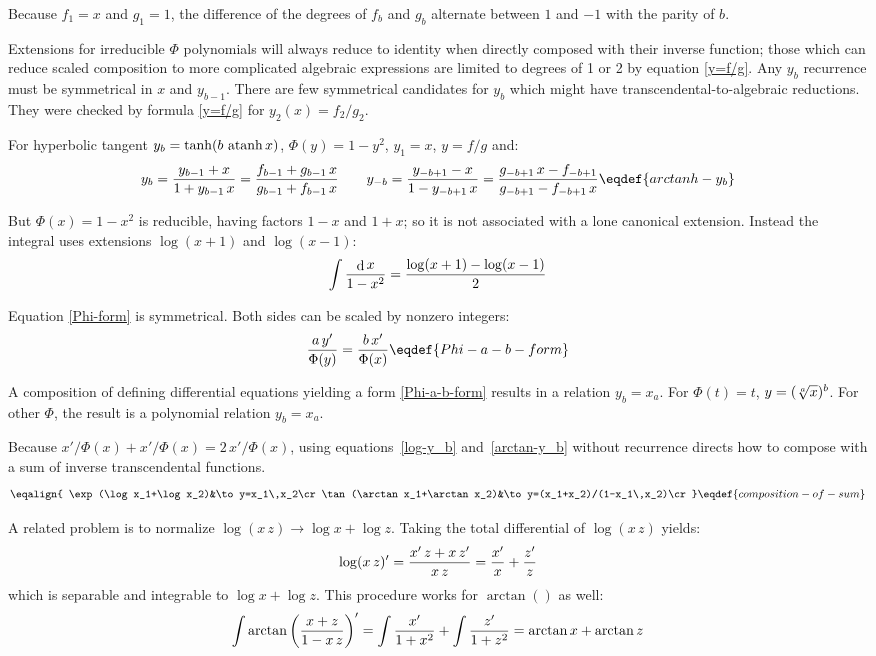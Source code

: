 Because $f_{1}=x$ and $g_{1}=1$, the difference of the degrees of
$f_{b}$ and $g_{b}$ alternate between $1$ and $-1$ with the parity of
$b$.

Extensions for irreducible $\Phi$ polynomials will always reduce
to identity when directly composed with their inverse function; those
which can reduce scaled composition to more complicated algebraic
expressions are limited to degrees of 1 or 2 by
equation \eqref{y=f/g}.  Any $y_{b}$ recurrence must be symmetrical in
$x$ and $y_{b-1}$.  There are few symmetrical candidates for $y_{b}$
which might have transcendental-to-algebraic reductions.  They were
checked by formula \eqref{y=f/g} for $y_2(x)=f_2/g_2$.

For hyperbolic tangent $y_{b}=\tanh(b\,\mathop{\rm atanh}\nolimits x)$, $\Phi(y)=1-y^2$, $y_{1}=x$, $y=f/g$ and:
$$y_{b}={y_{b-1}+x\over1+y_{b-1}\,x}=
  {f_{b-1}+g_{b-1}\,x\over g_{b-1}+f_{b-1}\,x}\qquad
  y_{-b}={y_{-b+1}-x\over1-y_{-b+1}\,x}=
  {g_{-b+1}\,x-f_{-b+1}\over g_{-b+1}-f_{-b+1}\,x}\eqdef{arctanh-y_b}$$

But $\Phi(x)=1-x^2$ is reducible, having factors $1-x$ and $1+x$; so
it is not associated with a lone canonical extension.  Instead
the integral uses extensions $\log(x+1)$ and $\log(x-1)$:
$$\int{\mathop{\rm d}\nolimits{x}\over1-x^2}={\log(x+1)-\log(x-1)\over2}$$

Equation \eqref{Phi-form} is symmetrical.  Both sides can be scaled by
nonzero integers:
$${a\,y'\over\Phi(y)}={b\,x'\over\Phi(x)}\eqdef{Phi-a-b-form}$$

A composition of defining differential equations yielding a
form \eqref{Phi-a-b-form} results in a relation $y_{b}=x_{a}$.  For
$\Phi(t)=t$, $y=(\root{a}\of{x})^b$.  For other $\Phi$, the result is
a polynomial relation $y_{b}=x_{a}$.

Because ${x'/\Phi(x)}+{x'/\Phi(x)}=2\,{x'/\Phi(x)}$, using
equations~\eqref{log-y_b} and~\eqref{arctan-y_b} without recurrence
directs how to compose with a sum of inverse transcendental functions.
$$\eqalign{
  \exp(\log x_1+\log x_2)&\to y=x_1\,x_2\cr
  \tan(\arctan x_1+\arctan x_2)&\to y=(x_1+x_2)/(1-x_1\,x_2)\cr
  }\eqdef{composition-of-sum}$$

A related problem is to normalize $\log(x\,z)\to\log x+\log z$.
Taking the total differential of $\log(x\,z)$ yields:
  $$\log(x\,z)'={x'\,z+x\,z'\over x\,z}={x'\over x}+{z'\over z}$$
which is separable and integrable to $\log x+\log z$.  This procedure
works for $\arctan()$ as well:
  $$\int\arctan\left({x+z\over1-x\,z}\right)'=\int{x'\over1+x^2}+\int{z'\over1+z^2}
  =\arctan x+\arctan z$$

